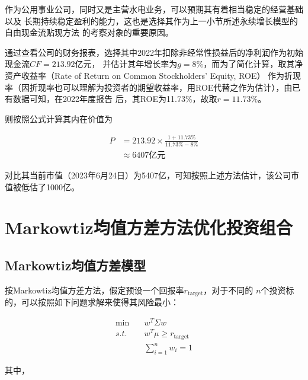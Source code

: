 \documentclass[UTF8]{ctexart}
\numberwithin{figure}{section}
\numberwithin{table}{section}
\numberwithin{equation}{section}
\begin{document}
        作为公用事业公司，同时又是主营水电业务，可以预期其有着相当稳定的经营基础以及
    长期持续稳定盈利的能力，这也是选择其作为上一小节所述永续增长模型的自由现金流贴现方法
    的考察对象的重要原因。

        通过查看公司的财务报表，选择其中2022年扣除非经常性损益后的净利润作为初始现金流$CF=213.92$亿元，
    并估计其年增长率为$g=8\%$，而为了简化计算，取其净资产收益率（Rate of Return on Common Stockholders’ Equity, ROE）
    作为折现率（因折现率也可以理解为投资者的期望收益率，用ROE代替之作为估计），由已有数据可知，在2022年度报告
    后，其ROE为11.73\%，故取$r = 11.73\%$。

        则按照公式计算其内在价值为

        \begin{equation}
            \begin{aligned}
                P &= 213.92 \times \frac{1 + 11.73\%}{11.73\% - 8\%} \\
                    &\approx 6407 \text{亿元}
            \end{aligned}
        \end{equation}

        对比其当前市值（2023年6月24日）为5407亿，可知按照上述方法估计，该公司市值被低估了1000亿。


        
\newpage



\section{Markowtiz均值方差方法优化投资组合}
    \subsection{Markowtiz均值方差模型}
        按Markowtiz均值方差方法，假定预设一个回报率$r_{\text{target}}$，对于不同的
    $n$个投资标的，可以按照如下问题求解来使得其风险最小：

    \begin{equation}
        \begin{aligned}
            \text{min} \quad & w^T \Sigma w \\
            s.t. \quad & w^T \mu \geq r_{\text{target}} \\
            & \sum_{i = 1}^{n}w_i = 1
        \end{aligned}
    \end{equation}

        其中，
\end{document}
